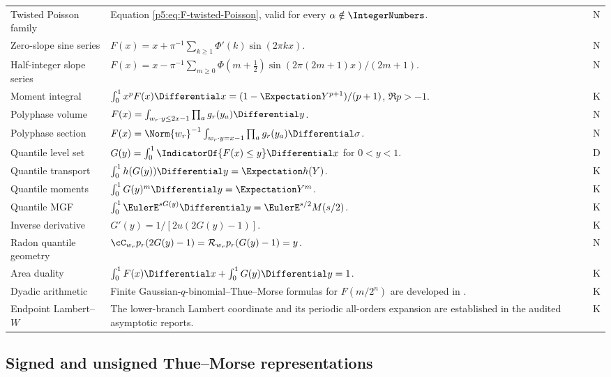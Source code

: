 \documentclass[11pt]{article}
\theoremstyle{definition}
\theoremstyle{remark}
\newcommand{\cR}{\mathcal R}
\newcommand{\statusknown}{\textsf{K}}
\newcommand{\statusderived}{\textsf{D}}
\newcommand{\statusnew}{\textsf{N}}
\begin{document}
\begin{longtable}{@{}p{}p{}p{}@{}}
Twisted Poisson family &
Equation \eqref{p5:eq:F-twisted-Poisson}, valid for every $\alpha\notin\IntegerNumbers$. & \statusnew\\
Zero-slope sine series &
$F(x)=x+\pi^{-1}\sum_{k\ge1}\Phi'(k)\sin(2\pi kx)$. & \statusnew\\
Half-integer slope series &
$F(x)=x-\pi^{-1}\sum_{m\ge0}\Phi(m+\tfrac12)
\sin(2\pi(2m+1)x)/(2m+1)$. & \statusnew\\
Moment integral &
$\int_0^1x^pF(x)\Differential x=(1-\Expectation Y^{p+1})/(p+1)$, $\Re p>-1$. & \statusknown\\
Polyphase volume &
$F(x)=\int_{w_r\cdot y\le2x-1}\prod_ag_r(y_a)\Differential y$. & \statusnew\\
Polyphase section &
$F(x)=\Norm{w_r}^{-1}\int_{w_r\cdot y=x-1}\prod_ag_r(y_a)\Differential\sigma$. & \statusnew\\
Quantile level set &
$G(y)=\int_0^1\IndicatorOf{F(x)\le y}\Differential x$ for $0<y<1$. & \statusderived\\
Quantile transport &
$\int_0^1h(G(y))\Differential y=\Expectation h(Y)$. & \statusknown\\
Quantile moments &
$\int_0^1G(y)^m\Differential y=\Expectation Y^m$. & \statusknown\\
Quantile MGF &
$\int_0^1\EulerE^{sG(y)}\Differential y=\EulerE^{s/2}M(s/2)$. & \statusknown\\
Inverse derivative &
$G'(y)=1/[2u(2G(y)-1)]$. & \statusknown\\
Radon quantile geometry &
$\cC_{w_r}p_r(2G(y)-1)=\cR_{w_r}p_r(G(y)-1)=y$. & \statusnew\\
Area duality &
$\int_0^1F(x)\Differential x+\int_0^1G(y)\Differential y=1$. & \statusknown\\
Dyadic arithmetic &
Finite Gaussian-$q$-binomial--Thue--Morse formulas for $F(m/2^n)$ are developed in \cite{p5:repoPrimary,p5:repoAtlas}. & \statusknown\\
Endpoint Lambert--$W$ &
The lower-branch Lambert coordinate and its periodic all-orders expansion are established in the audited asymptotic reports. & \statusknown\\
\bottomrule
\end{longtable}

\subsection{Signed and unsigned Thue--Morse representations}
\end{document}

